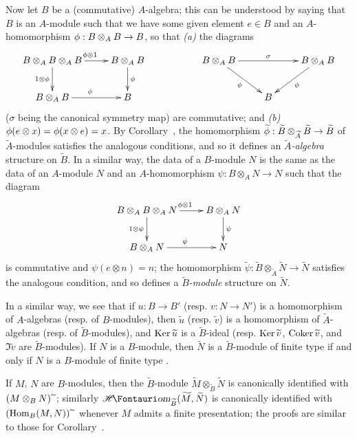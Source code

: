 \begin{env}[1.3.13]
\label{I.1.3.13}
Now let $B$ be a (commutative) $A$-algebra; this can be understood by saying that $B$ is an $A$-module such that we have some given element $e\in B$ and an $A$-homomorphism $\vphi:B\otimes_A B\to B$, so that \emph{(a)} the diagrams
\[
  \xymatrix{
    B\otimes_A B\otimes_A B\ar[r]^{\vphi\otimes 1}\ar[d]_{1\otimes\vphi} &
    B\otimes_A B\ar[d]^\vphi & &
    B\otimes_A B\ar[rr]^\sigma\ar[rd]_\vphi & &
    B\otimes_A B\ar[dl]^\vphi\\
    B\otimes_A B\ar[r]^\vphi &
    B & & &
    B
  }
\]
($\sigma$ being the canonical symmetry map) are commutative; and \emph{(b)} $\phi(e\otimes x)=\phi(x\otimes e)=x$.
By Corollary~, the homomorphism $\widetilde{\vphi}:\widetilde{B}\otimes_{\widetilde{A}}\widetilde{B}\to\widetilde{B}$ of $\widetilde{A}$-modules satisfies the analogous conditions, and so it defines an \emph{$\widetilde{A}$-algebra} structure on $\widetilde{B}$.
In a similar way, the data of a $B$-module $N$ is the same as the data of an $A$-module $N$ and an $A$-homomorphism $\psi:B\otimes_A N\to N$ such that the diagram
\[
  \xymatrix{
    B\otimes_A B\otimes_A N\ar[r]^{\vphi\otimes 1}\ar[d]_{1\otimes\psi} &
    B\otimes_A N\ar[d]^\psi\\
    B\otimes_A N\ar[r]^\psi &
    N
  }
\]
is commutative and $\psi(e\otimes n)=n$;
the homomorphism $\widetilde{\psi}:\widetilde{B}\otimes_{\widetilde{A}}\widetilde{N}\to\widetilde{N}$ satisfies the analogous condition, and so defines a \emph{$\widetilde{B}$-module} structure on $\widetilde{N}$.

In a similar way, we see that if $u:B\to B'$ (resp. $v:N\to N'$) is a homomorphism of $A$-algebras (resp. of $B$-modules), then $\widetilde{u}$ (resp. $\widetilde{v}$) is a homomorphism of $\widetilde{A}$-algebras (resp. of $\widetilde{B}$-modules), and $\operatorname{Ker}\widetilde{u}$ is a $\widetilde{B}$-ideal (resp. $\operatorname{Ker}\widetilde{v}$, $\operatorname{Coker}\widetilde{v}$, and $\Im\widetilde{v}$ are $\widetilde{B}$-modules).
If $N$ is a $B$-module, then $\widetilde{N}$ is a $\widetilde{B}$-module of finite type if and only if $N$ is a $B$-module of finite type .

If $M$, $N$ are $B$-modules, then the $\widetilde{B}$-module $\widetilde{M}\otimes_{\widetilde{B}}\widetilde{N}$ is canonically identified with $(M\otimes_B N){\,\widetilde{\,}\,}$;
similarly $\shHom_{\widetilde{B}}(\widetilde{M},\widetilde{N})$ is canonically identified with $(\operatorname{Hom}_B(M,N)){\,\widetilde{\,}\,}$ whenever $M$ admits a finite presentation;
the proofs are similar to those for Corollary~.


\end{env}
